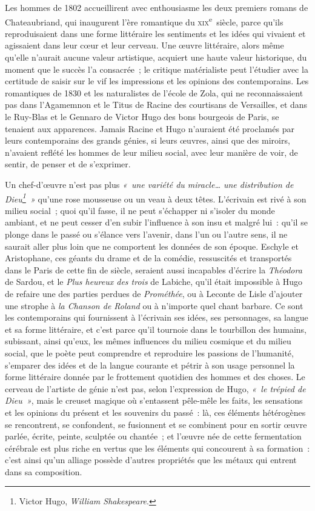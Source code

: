 \documentclass[french,twoside]{book} %
\begin{document}
\noindent Les hommes de 1802 accueillirent avec enthousiasme les deux premiers romans de Chateaubriand, qui inaugurent l’ère romantique du \textsc{xix}\textsuperscript{e} siècle, parce qu’ils reproduisaient dans une forme littéraire les sentiments et les idées qui vivaient et agissaient dans leur cœur et leur cerveau. Une œuvre littéraire, alors même qu’elle n’aurait aucune valeur artistique, acquiert une haute valeur historique, du moment que le succès l’a consacrée ; le critique matérialiste peut l’étudier avec la certitude de saisir sur le vif les impressions et les opinions des contemporains. Les romantiques de 1830 et les naturalistes de l’école de Zola, qui ne reconnaissaient pas dans l’Agamemnon et le Titus de Racine des courtisans de Versailles, et dans le Ruy-Blas et le Gennaro de Victor Hugo des bons bourgeois de Paris, se tenaient aux apparences. Jamais Racine et Hugo n’auraient été proclamés par leurs contemporains des grands génies, si leurs œuvres, ainsi que des miroirs, n’avaient reflété les hommes de leur milieu social, avec leur manière de voir, de sentir, de penser et de s’exprimer.\par
Un chef-d’œuvre n’est pas plus \emph{« une variété du miracle… une distribution de Dieu\footnote{Victor Hugo, \emph{William Shakespeare}.} »} qu’une rose mousseuse ou un veau à deux têtes. L’écrivain est rivé à son milieu social ; quoi qu’il fasse, il ne peut s’échapper ni s’isoler du monde ambiant, et ne peut cesser d’en subir l’influence à son insu et malgré lui : qu’il se plonge dans le passé ou s’élance vers l’avenir, dans l’un ou l’autre sens, il ne saurait aller plus loin que ne comportent les données de son époque. Eschyle et Aristophane, ces géants du drame et de la comédie, ressuscités et transportés  
\label{p607}dans le Paris de cette fin de siècle, seraient aussi incapables d’écrire la \emph{Théodora} de Sardou, et le \emph{Plus heureux des trois} de Labiche, qu’il était impossible à Hugo de refaire une des parties perdues de \emph{Prométhée}, ou à Leconte de Lisle d’ajouter une strophe à \emph{la Chanson de Roland} ou à n’importe quel chant barbare. Ce sont les contemporains qui fournissent à l’écrivain ses idées, ses personnages, sa langue et sa forme littéraire, et c’est parce qu’il tournoie dans le tourbillon des humains, subissant, ainsi qu’eux, les mêmes influences du milieu cosmique et du milieu social, que le poète peut comprendre et reproduire les passions de l’humanité, s’emparer des idées et de la langue courante et pétrir à son usage personnel la forme littéraire donnée par le frottement quotidien des hommes et des choses. Le cerveau de l’artiste de génie n’est pas, selon l’expression de Hugo, \emph{« le trépied de Dieu »}, mais le creuset magique où s’entassent pêle-mêle les faits, les sensations et les opinions du présent et les souvenirs du passé : là, ces éléments hétérogènes se rencontrent, se confondent, se fusionnent et se combinent pour en sortir œuvre parlée, écrite, peinte, sculptée ou chantée ; et l’œuvre née de cette fermentation cérébrale est plus riche en vertus que les éléments qui concourent à sa formation : c’est ainsi qu’un alliage possède d’autres propriétés que les métaux qui entrent dans sa composition.\par
\end{document}
